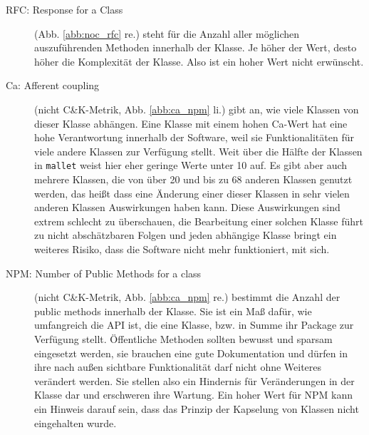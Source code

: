 \documentclass{scrreprt}
\newcommand{\lstx}[1]{\lstinline$#1$}
\begin{document}
\begin{description}
    
    
\item [RFC: Response for a Class] (Abb. \ref{abb:noc_rfc} re.)
    steht für die Anzahl aller möglichen auszuführenden Methoden innerhalb der Klasse. Je höher der Wert, desto höher die Komplexität der Klasse. Also ist ein hoher Wert nicht erwünscht.

    
    
\item [Ca: Afferent coupling] (nicht C\&K-Metrik, Abb. \ref{abb:ca_npm} li.)
    gibt an, wie viele Klassen von dieser Klasse abhängen. Eine Klasse mit einem hohen Ca-Wert hat eine hohe Verantwortung innerhalb der Software, weil sie Funktionalitäten für viele andere Klassen zur Verfügung stellt. 
    Weit über die Hälfte der Klassen in \lstx{mallet} weist hier eher geringe Werte unter 10 auf. Es gibt aber auch mehrere Klassen, die von über 20 und bis zu 68 anderen Klassen genutzt werden, das heißt dass eine Änderung einer dieser Klassen in sehr vielen anderen Klassen Auswirkungen haben kann. Diese Auswirkungen sind extrem schlecht zu überschauen, die Bearbeitung einer solchen Klasse führt zu nicht abschätzbaren Folgen und jeden abhängige Klasse bringt ein weiteres Risiko, dass die Software nicht mehr funktioniert, mit sich.

\item [NPM: Number of Public Methods for a class] (nicht C\&K-Metrik, Abb. \ref{abb:ca_npm} re.)
 bestimmt die Anzahl der public methods innerhalb der Klasse. Sie ist ein Maß dafür, wie umfangreich die API ist, die eine Klasse, bzw. in Summe ihr Package zur Verfügung stellt. Öffentliche Methoden sollten bewusst und sparsam eingesetzt werden, sie brauchen eine gute Dokumentation und dürfen in ihre nach außen sichtbare Funktionalität darf nicht ohne Weiteres verändert werden. Sie stellen also ein Hindernis für Veränderungen in der Klasse dar und erschweren ihre Wartung.
 Ein  hoher Wert für NPM kann ein Hinweis darauf sein, dass das Prinzip der Kapselung von Klassen nicht eingehalten wurde. 



\end{description}
\end{document}
